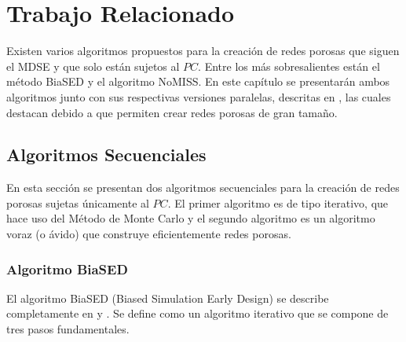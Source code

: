 \chapter{Trabajo Relacionado}
\label{champ:relatedwork}
\bigskip
\barra
\bigskip

Existen varios algoritmos propuestos para la creación de redes porosas que siguen el MDSE y que solo están sujetos al $PC$. Entre 
los más sobresalientes están el m\'etodo BiaSED\cite{ref1} y el algoritmo NoMISS\cite{ref3}. En este cap\'itulo se presentar\'an
ambos algoritmos junto con sus respectivas versiones paralelas, descritas en \cite{ref4}, las cuales destacan 
debido a que permiten crear redes porosas de gran tamaño.\\

\section{Algoritmos Secuenciales}
\label{subsec:seqversions}
En esta sección se presentan dos algoritmos secuenciales para la creación de redes porosas sujetas \'unicamente al $PC$. El primer
algoritmo es de tipo iterativo, que hace uso del M\'etodo de Monte Carlo \cite{ref15} y el segundo algoritmo es un algoritmo voraz (o ávido)
que construye eficientemente redes porosas.\\

\subsection{Algoritmo BiaSED}
\label{subsubsec:biased}
El algoritmo BiaSED (Biased Simulation Early Design) se describe completamente en \cite{ref1} y \cite{ref4}. Se define como un 
algoritmo iterativo que se compone de tres pasos fundamentales. 

